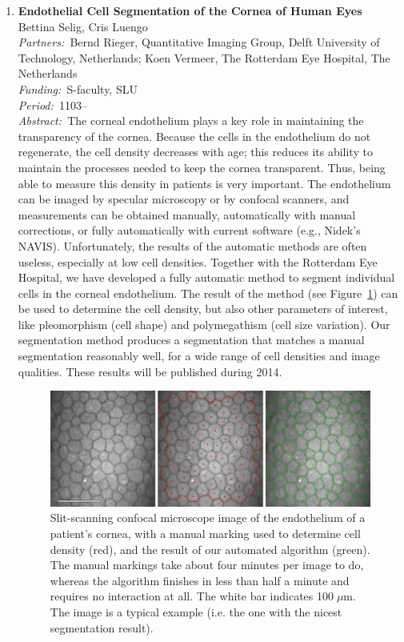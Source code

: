 \documentclass[10pt, a4paper]{article}
\newcommand{\aabstract}[1]{\emph{Abstract:~}#1}
\newcommand{\ffunding}[1]{\emph{Funding:~}#1\\}
\newcommand{\ppartners}[1]{\emph{Partners:~}#1\\}
\newcommand{\pperiod}[1]{\emph{Period:~}#1\\}
\begin{document}
\begin{enumerate}
\item \textbf{Endothelial Cell Segmentation of the Cornea of Human Eyes}\\
Bettina Selig, Cris Luengo\\
\ppartners{Bernd Rieger, Quantitative Imaging Group, Delft University
of Technology, Netherlands; Koen Vermeer, The Rotterdam Eye Hospital, The Netherlands}
\ffunding{S-faculty, SLU}
\pperiod{1103--}
\aabstract{The corneal endothelium plays a key role in maintaining the
transparency of the cornea. Because the cells in the endothelium do not
regenerate, the cell density decreases with age; this reduces its ability
to maintain the processes needed to keep the cornea transparent. Thus, being
able to measure this density in patients is very important. The endothelium
can be imaged by specular microscopy or by confocal scanners, and measurements
can be obtained manually, automatically with manual corrections, or fully
automatically with current software (e.g., Nidek's NAVIS). Unfortunately, the
results of the automatic methods are often useless, especially at low cell
densities. Together with the Rotterdam Eye Hospital, we have developed a fully
automatic method to segment individual cells in the corneal endothelium. The
result of the method (see Figure~\ref{fig:cornea}) can be used to determine
the cell density, but also other parameters of interest, like pleomorphism
(cell shape) and polymegathism (cell size variation). Our segmentation method produces a segmentation that matches a manual segmentation reasonably well, for a wide range of cell densities and image qualities. These results will be
published during 2014.}

\begin{figure}[!htbp]
\centering
\includegraphics[width=.85\textwidth]{figures/research/corneal_epithelium.png}
\caption{\label{fig:cornea}
Slit-scanning confocal microscope image of the endothelium of a patient's cornea, with a manual marking used to determine cell density (red), and the result of our automated algorithm (green). The manual markings take about four minutes per image to do, whereas the algorithm finishes in less than half a minute and requires no interaction at all. The white bar indicates 100$\;\mu$m. The image is a typical example (i.e. the one with the nicest segmentation result).}
\end{figure}


\end{enumerate}
\end{document}
